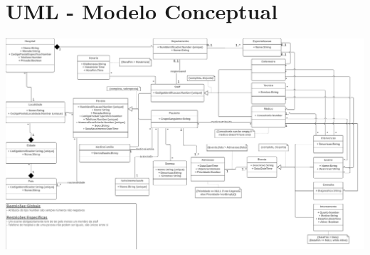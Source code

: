 \documentclass[article, a4paper, 12pt, oneside]{memoir}
\begin{document}
\newpage
\chapter[UML - Modelo Conceptual][UML]{UML - Modelo Conceptual} \label{\thechapter}
\hspace*{-1.3cm}\includegraphics[width=1.1\linewidth, height=1.0\linewidth]{BDAD-UML.png}
\end{document}
